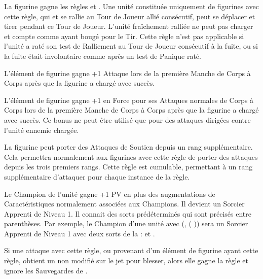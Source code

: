 
La figurine gagne les règles \vanguard{} et \newfromWHB{\lighttroops}. Une unité constituée uniquement de figurines avec cette règle, qui  et se rallie au Tour de Joueur allié consécutif, peut se déplacer et tirer pendant ce Tour de Joueur. L'unité fraîchement ralliée ne peut pas charger et compte comme ayant bougé pour le Tir. Cette règle n'est pas applicable si l'unité a raté son test de Ralliement au Tour de Joueur consécutif à la fuite, ou si la fuite était involontaire comme après un test de Panique raté.


L'élément de figurine gagne +1 Attaque lors de la première Manche de Corps à Corps après que la figurine a chargé avec succès.


L'élément de figurine gagne +1 en Force pour ses Attaques normales de Corps à Corps lors de la première Manche de Corps à Corps après que la figurine a chargé avec succès. Ce bonus ne peut être utilisé que pour des attaques dirigées contre l'unité ennemie chargée.


La figurine peut porter des Attaques de Soutien depuis un rang supplémentaire. Cela permettra normalement aux figurines avec cette règle de porter des attaques depuis les trois premiers rangs. Cette règle est cumulable, permettant à un rang supplémentaire d'attaquer pour chaque instance de la règle.


Le Champion de l'unité gagne +1 PV en plus des augmentations de Caractéristiques normalement associées aux Champions. Il devient un Sorcier Apprenti de Niveau 1. Il connait des sorts prédéterminés qui sont précisés entre parenthèses. Par exemple, le Champion d'une unité avec \og \wizardconclave{} (\changesignature{}, \changespellone{} (\Pathof{} \change{})) \fg{} sera un Sorcier Apprenti de Niveau 1 avec deux sorts de la \Pathof{} \change{} : \changesignature{} et \changespellone{}.


Si une attaque avec cette règle, ou provenant d'un élément de figurine ayant cette règle, obtient un  non modifié sur le jet pour blesser, alors elle gagne la règle  et ignore les Sauvegardes de \regeneration{}.

